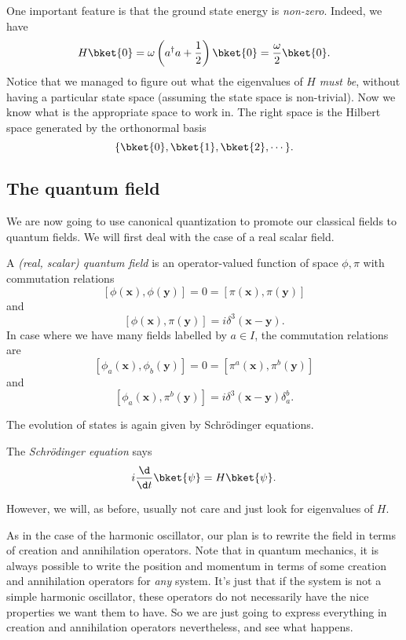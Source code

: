 \documentclass[a4paper]{article}
\begin{document}
One important feature is that the ground state energy is \emph{non-zero}. Indeed, we have
\[
  H \bket{0} = \omega\left(a^\dagger a + \frac{1}{2}\right)\bket{0} = \frac{\omega}{2} \bket{0}.
\]
Notice that we managed to figure out what the eigenvalues of $H$ \emph{must be}, without having a particular state space (assuming the state space is non-trivial). Now we know what is the appropriate space to work in. The right space is the Hilbert space generated by the orthonormal basis
\[
  \{\bket{0}, \bket{1}, \bket{2}, \cdots\}.
\]

\subsection{The quantum field}
We are now going to use canonical quantization to promote our classical fields to quantum fields. We will first deal with the case of a real scalar field.

\begin{defi}
  A \emph{(real, scalar) quantum field} is an operator-valued function of space $\phi, \pi$ with commutation relations
  \[
    [\phi(\mathbf{x}), \phi(\mathbf{y})] = 0 = [\pi(\mathbf{x}), \pi(\mathbf{y})]
  \]
  and
  \[
    [\phi(\mathbf{x}), \pi(\mathbf{y})] = i \delta^3(\mathbf{x} - \mathbf{y}).
  \]
  In case where we have many fields labelled by $a \in I$, the commutation relations are
  \[
    [\phi_a(\mathbf{x}), \phi_b(\mathbf{y})] = 0 = [\pi^a(\mathbf{x}), \pi^b(\mathbf{y})]
  \]
  and
  \[
    [\phi_a(\mathbf{x}), \pi^b(\mathbf{y})] = i \delta^3(\mathbf{x} - \mathbf{y}) \delta_a^b.
  \]
\end{defi}

The evolution of states is again given by Schr\"odinger equations.
\begin{defi}
  The \emph{Schr\"odinger equation} says
  \[
    i \frac{\d}{\d t}\bket{\psi} = H \bket{\psi}.
  \]
\end{defi}
However, we will, as before, usually not care and just look for eigenvalues of $H$.

As in the case of the harmonic oscillator, our plan is to rewrite the field in terms of creation and annihilation operators. Note that in quantum mechanics, it is always possible to write the position and momentum in terms of some creation and annihilation operators for \emph{any} system. It's just that if the system is not a simple harmonic oscillator, these operators do not necessarily have the nice properties we want them to have. So we are just going to express everything in creation and annihilation operators nevertheless, and see what happens.
\end{document}
